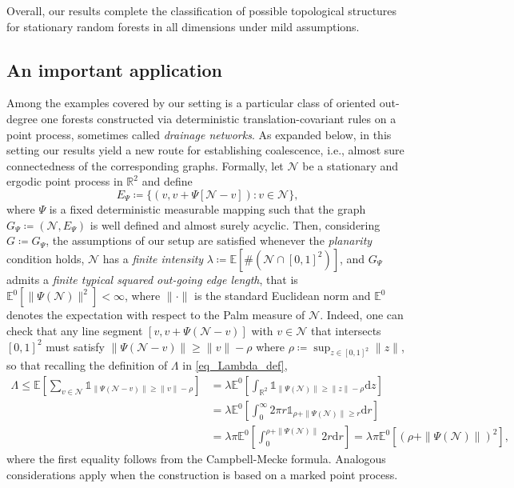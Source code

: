 \documentclass[a4paper, 11pt]{article} %
\theoremstyle{plain}
\newcommand{\E}{\mathbb{E}}
\newcommand{\R}{\mathbb{R}}
\newcommand{\N}{\mathcal{N}}
\newcommand{\1}{\mathds 1}
\numberwithin{equation}{section}
\begin{document}
Overall, our results complete the classification of possible topological structures for stationary random forests in all dimensions under mild assumptions.


\subsection*{An important application}


Among the examples covered by our setting is a particular class of oriented out-degree one forests constructed via deterministic translation-covariant rules on a point process, sometimes called \emph{drainage networks}. As expanded below, in this setting our results yield a new route for establishing coalescence, i.e., almost sure connectedness of the corresponding graphs. Formally, let $\N$ be a stationary and ergodic point process in $\R^2$ and define
    \[E_\Psi\coloneqq\{(v, v+\Psi[\mathcal{N}-v]):v\in\N\},\]
where $\Psi$ is a fixed deterministic measurable mapping such that the graph $G_\Psi\coloneq(\N,E_\Psi)$ is well defined and almost surely acyclic. Then, considering $G\coloneqq G_\Psi$, the assumptions of our setup are satisfied whenever the \emph{planarity} condition holds, $\N$ has a \emph{finite intensity} $\lambda\coloneqq\mathbb{E}[\#(\mathcal{N} \cap [0,1]^2)]$, and $G_\Psi$ admits a \emph{finite typical squared out-going edge length}, that is $\E^0[\|\Psi(\N)\|^2]<\infty$, where $\|\cdot\|$ is the standard Euclidean norm and $\E^0$ denotes the expectation with respect to the Palm measure of $\N$. Indeed, one can check that any line segment $[v, v+\Psi(\N-v)]$ with $v\in\N$ that intersects $[0,1]^2$ must satisfy $\|\Psi(\N-v)\|\geq\|v\|-\rho$ where $\rho\coloneqq\sup_{z\in[0,1]^2}\|z\|$, so that recalling the definition of $\Lambda$ in \eqref{eq_Lambda_def},
    \begin{equation*}
        \begin{split}
            \Lambda\leq\E\left[\sum_{v\in\N}\1_{\|\Psi(\N-v)\|\geq\|v\|-\rho}\right]
            &=\lambda\E^0\left[\int_{\R^2}\1_{\|\Psi(\N)\|\geq\|z\|-\rho}\mathrm dz\right]\\
            &=\lambda\E^0\left[\int_0^\infty 2\pi r\1_{\rho+\|\Psi(\N)\|\geq r}\mathrm dr\right]\\
            &=\lambda\pi\E^0\left[\int_0^{\rho+\|\Psi(\N)\|}2r\mathrm dr\right]
            =\lambda\pi\E^0[(\rho+\|\Psi(\N)\|)^2],
        \end{split}
    \end{equation*}
where the first equality follows from the Campbell-Mecke formula. Analogous considerations apply when the construction is based on a marked point process. 
\end{document}
